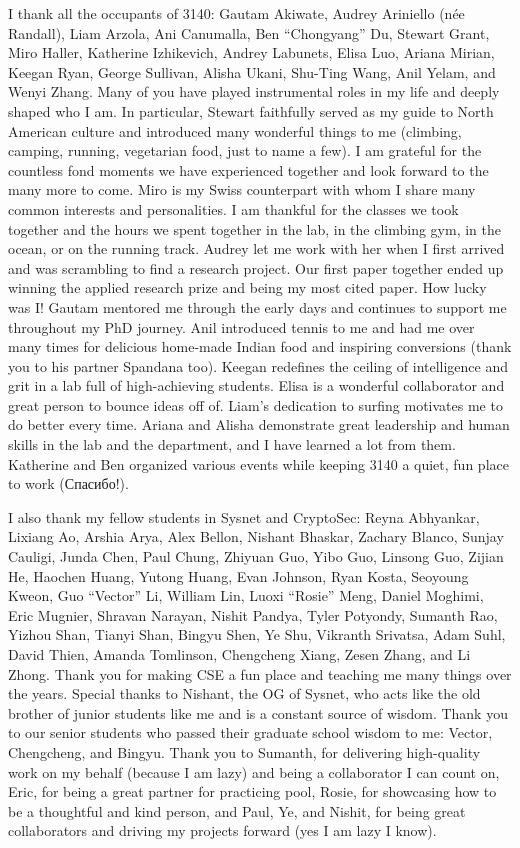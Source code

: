 \documentclass[12pt]{ucsddissertation}
\begin{document}
\begin{acknowledgements}
I thank all the occupants of 3140: Gautam Akiwate, Audrey Ariniello (née Randall), Liam Arzola, Ani Canumalla, Ben ``Chongyang'' Du, Stewart Grant, Miro Haller, Katherine Izhikevich, Andrey Labunets, Elisa Luo, Ariana Mirian, Keegan Ryan, George Sullivan, Alisha Ukani, Shu-Ting Wang, Anil Yelam, and Wenyi Zhang.
Many of you have played instrumental roles in my life and deeply shaped who I am. In particular, Stewart faithfully served as my guide to North American culture and introduced many wonderful things to me (climbing, camping, running, vegetarian food, just to name a few). I am grateful for the countless fond moments we have experienced together and look forward to the many more to come. Miro is my Swiss counterpart with whom I share many common interests and personalities. I am thankful for the classes we took together and the hours we spent together in the lab, in the climbing gym, in the ocean, or on the running track. Audrey let me work with her when I first arrived and was scrambling to find a research project. Our first paper together ended up winning the applied research prize and being my most cited paper. How lucky was I! Gautam mentored me through the early days and continues to support me throughout my PhD journey. Anil introduced tennis to me and had me over many times for delicious home-made Indian food and inspiring conversions (thank you to his partner Spandana too). Keegan redefines the ceiling of intelligence and grit in a lab full of high-achieving students. Elisa is a wonderful collaborator and great person to bounce ideas off of. Liam's dedication to surfing motivates me to do better every time. Ariana and Alisha demonstrate great leadership and human skills in the lab and the department, and I have learned a lot from them. Katherine and Ben organized various events while keeping 3140 a quiet, fun place to work ({Спасибо}!).

I also thank my fellow students in Sysnet and CryptoSec: Reyna Abhyankar, Lixiang Ao,  Arshia Arya, Alex Bellon, Nishant Bhaskar, Zachary Blanco, Sunjay Cauligi, Junda Chen, Paul Chung, Zhiyuan Guo, Yibo Guo, Linsong Guo, Zijian He, Haochen Huang, Yutong Huang, Evan Johnson, Ryan Kosta, Seoyoung Kweon, Guo ``Vector'' Li, William Lin, Luoxi ``Rosie'' Meng, Daniel Moghimi, Eric Mugnier, Shravan Narayan, Nishit Pandya, Tyler Potyondy, Sumanth Rao, Yizhou Shan, Tianyi Shan, Bingyu Shen, Ye Shu, Vikranth Srivatsa, Adam Suhl, David Thien, Amanda Tomlinson, Chengcheng Xiang, Zesen Zhang, and Li Zhong. Thank you for making CSE a fun place and teaching me many things over the years. Special thanks to Nishant, the OG of Sysnet, who acts like the old brother of junior students like me and is a constant source of wisdom. Thank you to our senior students who passed their graduate school wisdom to me: Vector, Chengcheng, and Bingyu. Thank you to Sumanth, for delivering high-quality work on my behalf (because I am lazy) and being a collaborator I can count on, Eric, for being a great partner for practicing pool, 
Rosie, for showcasing how to be a thoughtful and kind person, and Paul, Ye, and Nishit, for being great collaborators and driving my projects forward (yes I am lazy I know).


\end{acknowledgements}
\end{document}
